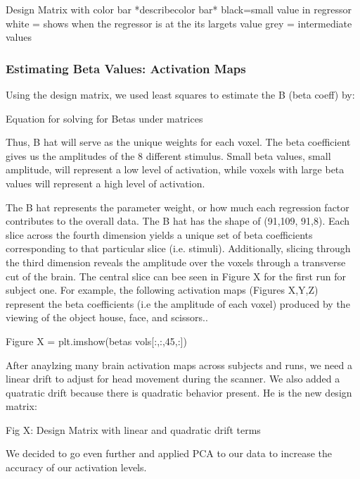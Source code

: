 \documentclass[11pt]{article}
\begin{document}
     Design Matrix with color bar  *describecolor bar*
     black=small value in regressor
     white = shows when the regressor is at the its largets value
     grey = intermediate values

\subsubsection{Estimating Beta Values: Activation Maps}
Using the design matrix, we used least squares to estimate the B (beta coeff) by:

     Equation for solving for Betas under matrices

Thus, B hat will serve as the unique weights for each voxel. The beta 
coefficient gives us the amplitudes of the 8 different stimulus. Small beta values, small amplitude,
will represent a low level of activation, while voxels with large beta values will
represent a high level of activation.

The B hat represents the parameter weight, or how much each regression factor 
contributes to the overall data. The B hat has the shape of (91,109, 91,8). 
Each slice across the fourth dimension yields a unique set of beta coefficients 
corresponding to that particular slice (i.e. stimuli). Additionally, slicing 
through the third dimension reveals the amplitude over the voxels through a 
transverse cut of the brain. The central slice can bee seen in Figure X for the 
first run for subject one.
For example, the following activation maps (Figures X,Y,Z) represent the beta 
coefficients (i.e the amplitude of each voxel) produced by the viewing of the 
object house, face, and scissors..

      Figure X = plt.imshow(betas vols[:,:,45,:])


After anaylzing many brain activation maps across subjects and runs, we need a linear drift to adjust for head movement during the scanner. We also added a quatratic drift because there is quadratic behavior present. He is the new design matrix:

      Fig X: Design Matrix with linear and quadratic drift terms
      
We decided to go even further and applied PCA to our data to increase the accuracy of our activation levels. 
\end{document}
